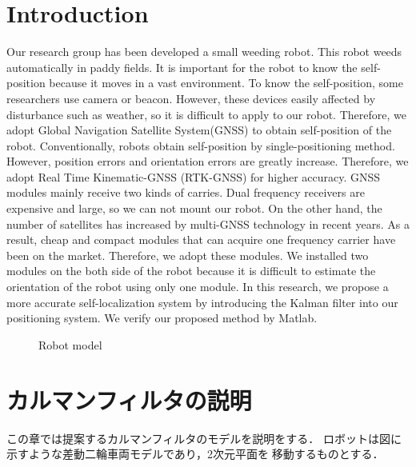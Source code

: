 \documentclass[a4paper]{article}
\begin{document}
\section{Introduction}
Our research group has been developed a small weeding robot\cite{aigamo}. This robot weeds automatically in paddy fields.
It is important for the robot to know the self-position because it moves in a vast environment. To know the self-position, 
some researchers use camera\cite{camera-relate} or beacon\cite{beacon-relate}. 
However, these devices easily affected by disturbance such as weather, so it is difficult to apply to our robot.
Therefore, we adopt Global Navigation Satellite System(GNSS) to obtain self-position of the robot.
Conventionally, robots obtain self-position by single-positioning method.
However, position errors and orientation errors are greatly increase.
Therefore, we adopt Real Time Kinematic-GNSS (RTK-GNSS) for higher accuracy.
GNSS modules mainly receive two kinds of carries.
Dual frequency receivers are expensive and large, so we can not mount our robot.
On the other hand, the number of satellites has increased by multi-GNSS technology in recent years. As a result, cheap and compact modules that can acquire one frequency carrier have been on the market.
Therefore, we adopt these modules.
We installed two modules on the both side of the robot because it is difficult to estimate the orientation of the robot using only one module.
In this research, we propose a more accurate self-localization system by introducing the Kalman filter into our positioning system.
We verify our proposed method by Matlab.

\begin{figure}
    \vspace{5mm}
    \centerline{}
    \caption{Robot model}
    \label{fig:1}
\end{figure}
\section{カルマンフィルタの説明}
この章では提案するカルマンフィルタのモデルを説明をする．
ロボットは図\label{fig1}に示すような差動二輪車両モデルであり，2次元平面を移動するものとする．
\end{document}
